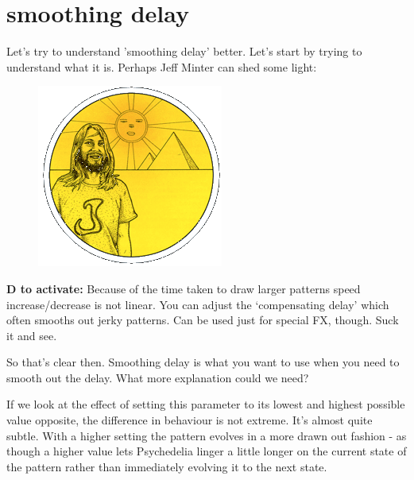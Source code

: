 \clearpage

\section*{smoothing delay} 
\label{sec:delay}
\lstset{style=6502Style}
\lstset{ 
   aboveskip=5pt,
   belowskip=0pt,
}
Let's try to understand 'smoothing delay' better. Let's start by trying to understand
what it is. Perhaps Jeff Minter can shed some light:

\begin{definition}
\setlength{\intextsep}{0pt}%
\setlength{\columnsep}{3pt}%
\begin{figure}
\includegraphics[width=\linewidth]{src/callout/psych.png} 
\end{figure}
\small
\textbf{D to activate:} Because of the time taken to
draw larger patterns speed increase/decrease is not linear. You
can adjust the ‘compensating delay’ which often smooths out jerky
patterns. Can be used just for special FX, though. Suck it and see.
\end{definition}

So that's clear then. Smoothing delay is what you want to use when
you need to smooth out the delay. What more explanation could we need?

If we look at the effect of setting this parameter to its lowest and
highest possible value opposite, the difference in behaviour is not
extreme. It's almost quite subtle. With a higher setting the pattern
evolves in a more drawn out fashion - as though a higher value lets
Psychedelia linger a little longer on the current state of the pattern
rather than immediately evolving it to the next state.

